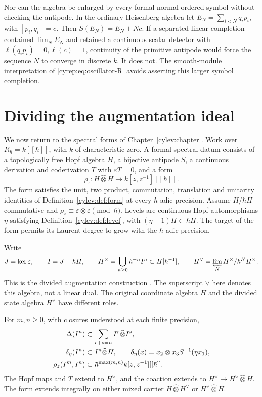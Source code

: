 Nor can the algebra be enlarged by every formal normal-ordered
symbol without checking the antipode. In the ordinary Heisenberg
algebra let \(E_N=\sum_{i<N}q_i p_i\), with
\([p_i,q_i]=c\). Then \(S(E_N)=E_N+Nc\).
If a separated linear completion contained \(\lim_NE_N\) and
retained a continuous scalar detector with
\(\ell(q_ip_i)=0,\ell(c)=1\), continuity of the primitive
antipode would force the sequence \(N\) to converge in discrete
\(k\). It does not. The smooth-module interpretation of
\eqref{cyrep:eq:oscillator-R} avoids asserting this larger
symbol completion.

\section{Dividing the augmentation ideal}
\label{cyrep:sec:divided}

We now return to the spectral forms of Chapter~\ref{cylev:chapter}.
Work over \(R_\hbar=k[[\hbar]]\), with \(k\) of characteristic zero.
A formal spectral datum consists of a topologically free Hopf algebra
\(H\), a bijective antipode \(S\), a continuous derivation and
coderivation \(T\) with \(\varepsilon T=0\), and a form
\[
 \rho_z:H\widehat\otimes H
       \longrightarrow k[z,z^{-1}][[\hbar]].
\]
The form satisfies the unit, two product, commutation, translation
and unitarity identities of Definition~\ref{cylev:def:form}
at every \(\hbar\)-adic precision.
Assume \(H/\hbar H\) commutative and
\(\rho_z\equiv\varepsilon\otimes\varepsilon\pmod\hbar\).
Levels are continuous Hopf automorphisms \(\eta\) satisfying
Definition~\ref{cylev:def:level}, with
\((\eta-1)H\subset\hbar H\).
The target of the form permits its Laurent degree to grow
with the \(\hbar\)-adic precision.

Write
\[
 J=\ker\varepsilon,\qquad I=J+\hbar H,\qquad
 H^\times=\bigcup_{n\geq0}\hbar^{-n}I^n\subset H[\hbar^{-1}],
 \qquad
 H^\vee=\varprojlim_N H^\times/\hbar^NH^\times.
\]
This is the divided augmentation construction
\cite{Gavarini2003}.
The superscript \(\vee\) here denotes this algebra,
not a linear dual.
The original coordinate algebra \(H\) and the divided state algebra
\(H^\vee\) have different roles.

\begin{lemma}\label{cyrep:lem:divided-estimates}
For \(m,n\geq0\), with closures understood at each finite precision,
\begin{align}
 \Delta(I^n)&\subset\sum_{r+s=n}I^r\widehat\otimes I^s,\notag\\
 \delta_\eta(I^n)&\subset I^n\widehat\otimes H,\qquad
 \delta_\eta(x)=x_2\otimes x_3S^{-1}(\eta x_1),\notag\\
 \rho_z(I^m,I^n)&\subset
       \hbar^{\max(m,n)}k[z,z^{-1}][[\hbar]].
 \label{cyrep:eq:divided-estimates}
\end{align}
The Hopf maps and \(T\) extend to \(H^\vee\), and the coaction
extends to \(H^\vee\to H^\vee\widehat\otimes H\).
The form extends integrally on either mixed carrier
\(H\widehat\otimes H^\vee\) or \(H^\vee\widehat\otimes H\).
\end{lemma}

